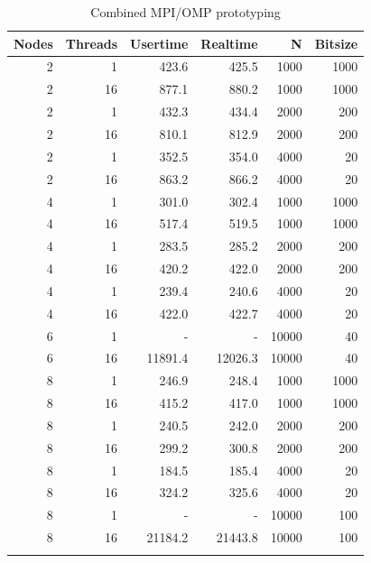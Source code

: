 \begin{table}[htb]
\renewcommand{\arraystretch}{1.1}
\begin{tabular}{rrrrrr}
\hline
 Nodes & Threads & Usertime & Realtime & N     & Bitsize\\
\hline
 2     & 1 & 423.6  & 425.5  & 1000  & 1000 \\
 2     & 16 & 877.1    & 880.2  & 1000  & 1000 \\
 2     & 1 & 432.3  & 434.4  & 2000  & 200  \\
 2     & 16 & 810.1  & 812.9  & 2000  & 200  \\
 2     & 1 & 352.5  & 354.0  & 4000  & 20   \\
 2     & 16 & 863.2  & 866.2  & 4000  & 20   \\
 4     & 1 & 301.0  & 302.4  & 1000  & 1000 \\
 4     & 16 & 517.4  & 519.5  & 1000  & 1000 \\
 4     & 1 & 283.5  & 285.2  & 2000  & 200  \\
 4     & 16 & 420.2  & 422.0  & 2000  & 200  \\
 4     & 1 & 239.4  & 240.6  & 4000  & 20   \\
 4     & 16 & 422.0  & 422.7  & 4000  & 20   \\
 6     & 1 &  - & -  & 10000 & 40   \\
 6     & 16 & 11891.4  & 12026.3  & 10000 & 40   \\
 8     & 1 & 246.9    & 248.4  & 1000  & 1000 \\
 8     & 16 & 415.2  & 417.0  & 1000  & 1000 \\
 8     & 1 & 240.5  & 242.0   & 2000  & 200  \\
 8     & 16 & 299.2  & 300.8  & 2000  & 200  \\
 8     & 1 & 184.5  & 185.4  & 4000  & 20   \\
 8     & 16 & 324.2  & 325.6  & 4000  & 20   \\
 8     & 1 &  - & -  & 10000 & 100  \\
 8     & 16 & 21184.2  & 21443.8  & 10000 & 100  \\
\hline
\vspace{0pt}
\end{tabular}
\caption{Combined MPI/OMP prototyping}\label{tab:HybridMPIOMP}
\end{table}





